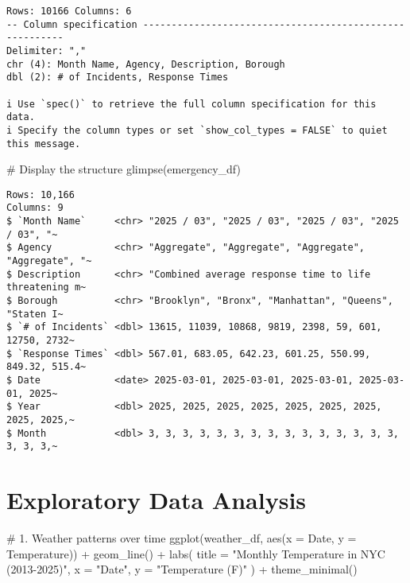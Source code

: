 \documentclass[
  letterpaper,
  DIV=11,
  numbers=noendperiod]{scrreprt}
\newenvironment{Shaded}{\begin{snugshade}}{\end{snugshade}}
\newcommand{\AttributeTok}[1]{\textcolor[rgb]{0.40,0.45,0.13}{#1}}
\newcommand{\CommentTok}[1]{\textcolor[rgb]{0.37,0.37,0.37}{#1}}
\newcommand{\FunctionTok}[1]{\textcolor[rgb]{0.28,0.35,0.67}{#1}}
\newcommand{\NormalTok}[1]{\textcolor[rgb]{0.00,0.23,0.31}{#1}}
\newcommand{\SpecialCharTok}[1]{\textcolor[rgb]{0.37,0.37,0.37}{#1}}
\newcommand{\StringTok}[1]{\textcolor[rgb]{0.13,0.47,0.30}{#1}}
\begin{document}
\begin{verbatim}
Rows: 10166 Columns: 6
-- Column specification --------------------------------------------------------
Delimiter: ","
chr (4): Month Name, Agency, Description, Borough
dbl (2): # of Incidents, Response Times

i Use `spec()` to retrieve the full column specification for this data.
i Specify the column types or set `show_col_types = FALSE` to quiet this message.
\end{verbatim}

\begin{Shaded}
\begin{Highlighting}[]
\CommentTok{\# Display the structure}
\FunctionTok{glimpse}\NormalTok{(emergency\_df)}
\end{Highlighting}
\end{Shaded}

\begin{verbatim}
Rows: 10,166
Columns: 9
$ `Month Name`     <chr> "2025 / 03", "2025 / 03", "2025 / 03", "2025 / 03", "~
$ Agency           <chr> "Aggregate", "Aggregate", "Aggregate", "Aggregate", "~
$ Description      <chr> "Combined average response time to life threatening m~
$ Borough          <chr> "Brooklyn", "Bronx", "Manhattan", "Queens", "Staten I~
$ `# of Incidents` <dbl> 13615, 11039, 10868, 9819, 2398, 59, 601, 12750, 2732~
$ `Response Times` <dbl> 567.01, 683.05, 642.23, 601.25, 550.99, 849.32, 515.4~
$ Date             <date> 2025-03-01, 2025-03-01, 2025-03-01, 2025-03-01, 2025~
$ Year             <dbl> 2025, 2025, 2025, 2025, 2025, 2025, 2025, 2025, 2025,~
$ Month            <dbl> 3, 3, 3, 3, 3, 3, 3, 3, 3, 3, 3, 3, 3, 3, 3, 3, 3, 3,~
\end{verbatim}

\section{Exploratory Data Analysis}\label{exploratory-data-analysis}

\begin{Shaded}
\begin{Highlighting}[]
\CommentTok{\# 1. Weather patterns over time}
\FunctionTok{ggplot}\NormalTok{(weather\_df, }\FunctionTok{aes}\NormalTok{(}\AttributeTok{x =}\NormalTok{ Date, }\AttributeTok{y =}\NormalTok{ Temperature)) }\SpecialCharTok{+}
  \FunctionTok{geom\_line}\NormalTok{() }\SpecialCharTok{+}
  \FunctionTok{labs}\NormalTok{(}
    \AttributeTok{title =} \StringTok{"Monthly Temperature in NYC (2013{-}2025)"}\NormalTok{,}
    \AttributeTok{x =} \StringTok{"Date"}\NormalTok{,}
    \AttributeTok{y =} \StringTok{"Temperature (F)"}
\NormalTok{  ) }\SpecialCharTok{+}
  \FunctionTok{theme\_minimal}\NormalTok{()}
\end{Highlighting}
\end{Shaded}
\end{document}

